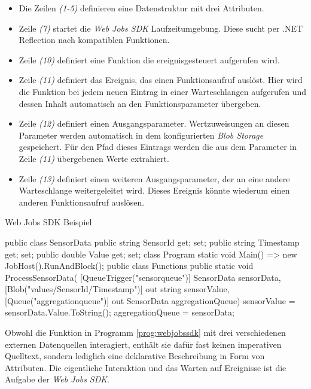 \begin{itemize}
	\item Die Zeilen \textit{(1-5)} definieren eine Datenstruktur mit drei Attributen.
	\item Zeile \textit{(7)} startet die \textit{Web Jobs SDK} Laufzeitumgebung. Diese sucht per .NET Reflection nach kompatiblen Funktionen.
	\item Zeile \textit{(10)} definiert eine Funktion die ereignisgesteuert aufgerufen wird.
	\item Zeile \textit{(11)} definiert das Ereignis, das einen Funktionsaufruf auslöst. Hier wird die Funktion bei jedem neuen Eintrag in einer Warteschlangen aufgerufen und dessen Inhalt automatisch an den Funktionsparameter übergeben.
	\item Zeile \textit{(12)} definiert einen Ausgangsparameter. Wertzuweisungen an diesen Parameter werden automatisch in dem konfigurierten \textit{Blob Storage} gespeichert. Für den Pfad dieses Eintrags werden die aus dem Parameter in Zeile \textit{(11)} übergebenen Werte extrahiert.
	\item Zeile \textit{(13)} definiert einen weiteren Ausgangsparameter, der an eine andere Warteschlange weitergeleitet wird. Dieses Ereignis könnte wiederum einen anderen Funktionsaufruf auslösen. 
\end{itemize}

\begin{program}[!hbt]
\caption{Web Jobs SDK Beispiel}
\label{prog:webjobssdk}
\begin{CsCode}
  public class SensorData {
    public string SensorId { get; set; }
    public string Timestamp { get; set; }
    public double Value { get; set; }
  }
  class Program {
    static void Main() => new JobHost().RunAndBlock();
  }
  public class Functions {
    public static void ProcessSensorData(
      [QueueTrigger("sensorqueue")] SensorData sensorData,
      [Blob("values/{SensorId}/{Timestamp}")] out string sensorValue,
      [Queue("aggregationqueue")] out SensorData aggregationQueue) {
      sensorValue = sensorData.Value.ToString();
      aggregationQueue = sensorData;
    }
  }
\end{CsCode}
\end{program}

Obwohl die Funktion in Programm \ref{prog:webjobssdk} mit drei verschiedenen externen Datenquellen interagiert, enthält sie dafür fast keinen imperativen Quelltext, sondern lediglich eine deklarative Beschreibung in Form von Attributen. Die eigentliche Interaktion und das Warten auf Ereignisse ist die Aufgabe der \textit{Web Jobs SDK}. 

